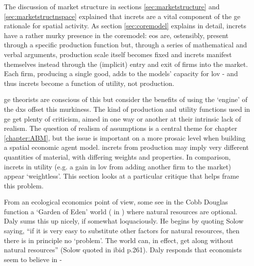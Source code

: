 The discussion of market structure in sections \ref{sec:marketstructure} and \ref{sec:marketstructnspace} explained that \gls{increts} are a vital component of the \gls{ge} rationale for spatial activity. As section \ref{sec:coremodel} explains in detail, \gls{increts} have a rather murky presence in the \gls{coremodel}: \gls{eos} are, ostensibly, present through a specific production function but, through a series of mathematical and verbal arguments, production scale itself becomes fixed and \gls{increts} manifest themselves instead through the (implicit) entry and exit of firms into the market. Each firm, producing a single good, adds to the models' capacity for \gls{lov} - and thus \gls{increts} become a function of utility, not production. 

\Gls{ge} theorists are conscious of this but consider the benefits of using the `engine' of the \gls{dxs} offset this murkiness. The kind of production and utility functions used in \gls{ge} get plenty of criticism, aimed in one way or another at their intrinsic lack of realism. The question of realism of assumptions is a central theme for chapter \ref{chapter:ABM}, but the issue is important on a more prosaic level when building a spatial economic agent model. \Gls{increts} from production may imply very different quantities of material, with differing weights and properties. In comparison, \gls{increts} in utility (e.g. a gain in \gls{lov} from adding another firm to the market) appear `weightless'. This section looks at a particular critique that helps frame this problem.

From an ecological economics point of view, some see in the Cobb Douglas function a `Garden of Eden' world (\citealt{georgescu-roegen_energy_1975} in \citealt{daly_georgescu-roegen_1997}) where natural resources are optional. Daly sums this up nicely, if somewhat loquaciously. He begins by quoting Solow saying, ``if it is very easy to substitute other factors for natural resources, then there is in principle no `problem'. The world can, in effect, get along without natural resources'' (Solow quoted in ibid p.261). Daly responds that economists seem to believe in - 

